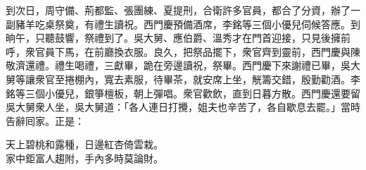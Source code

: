 到次日，周守備、荊都監、張團練、夏提刑，合衛許多官員，都合了分資，辦了一副豬羊吃桌祭奠，有禮生讀祝。西門慶預備酒席，李銘等三個小優兒伺候答應。到晌午，只聽鼓響，祭禮到了。吳大舅、應伯爵、溫秀才在門首迎接，只見後擁前呼，衆官員下馬，在前廳換衣服。良久，把祭品擺下，衆官齊到靈前，西門慶與陳敬濟還禮。禮生喝禮，三獻畢，跪在旁邊讀祝，祭畢。西門慶下來謝禮已畢，吳大舅等讓衆官至捲棚內，寬去素服，待畢茶，就安席上坐，觥籌交錯，殷勤勸酒。李銘等三個小優兒，銀箏檀板，朝上彈唱。衆官歡飲，直到日暮方散。西門慶還要留吳大舅衆人坐，吳大舅道：「各人連日打攪，姐夫也辛苦了，各自歇息去罷。」當時告辭囘家。正是：

\begin{myquote} 
天上碧桃和露種，日邊紅杏倚雲栽。\\家中鉅富人趨附，手內多時莫論財。
\end{myquote} 

